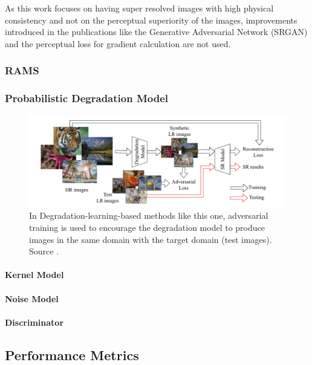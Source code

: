             As this work focuses on having super resolved images with high physical consistency and not on the perceptual superiority of the images, improvements introduced in the publications like the Generative Adversarial Network (SRGAN)  and the perceptual loss for gradient calculation are not used.
        

        \subsubsection{RAMS}
        \subsubsection{Probabilistic Degradation Model}

            \begin{figure}[h!]
                \centering
                \includegraphics[scale=0.55]{Includes/3-GAN-degradation-model.png}
                \caption{In Degradation-learning-based methods like this one, 
                         adversarial training is used to encourage the degradation model to produce images in the same domain with the target domain (test images).
                         Source \cite{luo2022learning}.}
                \label{fig:3-GAN-degradation-model}
            \end{figure}

            \paragraph{Kernel Model}
            \paragraph{Noise Model}
            \paragraph{Discriminator}


    \subsection{Performance Metrics}

